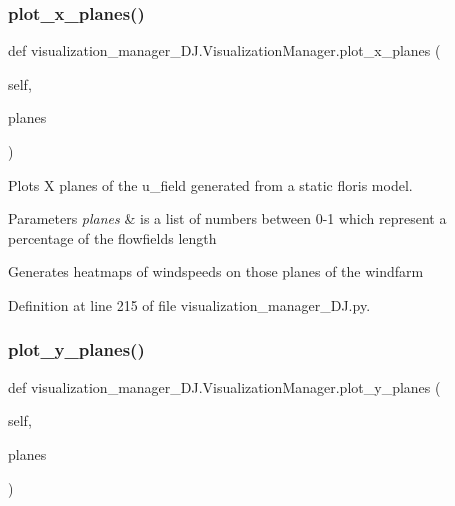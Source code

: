 \mbox{\label{classvisualization__manager___d_j_1_1_visualization_manager_a4705f5926bdcecfd8d2d5aff434b2120}} 
\subsubsection{\texorpdfstring{plot\+\_\+x\+\_\+planes()}{plot\_x\_planes()}}
{\footnotesize\ttfamily def visualization\+\_\+manager\+\_\+\+D\+J.\+Visualization\+Manager.\+plot\+\_\+x\+\_\+planes (\begin{DoxyParamCaption}\item[{}]{self,  }\item[{}]{planes }\end{DoxyParamCaption})}



Plots X planes of the u\+\_\+field generated from a static floris model. 


\begin{DoxyParams}{Parameters}
{\em planes} & is a list of numbers between 0-\/1 which represent a percentage of the flowfield\textquotesingle{}s length\\
\hline
\end{DoxyParams}
Generates heatmaps of windspeeds on those planes of the windfarm 

Definition at line 215 of file visualization\+\_\+manager\+\_\+\+D\+J.\+py.

\mbox{\label{classvisualization__manager___d_j_1_1_visualization_manager_ab0047d9eeda14999bdf8f8de191d9a33}} 
\subsubsection{\texorpdfstring{plot\+\_\+y\+\_\+planes()}{plot\_y\_planes()}}
{\footnotesize\ttfamily def visualization\+\_\+manager\+\_\+\+D\+J.\+Visualization\+Manager.\+plot\+\_\+y\+\_\+planes (\begin{DoxyParamCaption}\item[{}]{self,  }\item[{}]{planes }\end{DoxyParamCaption})}



